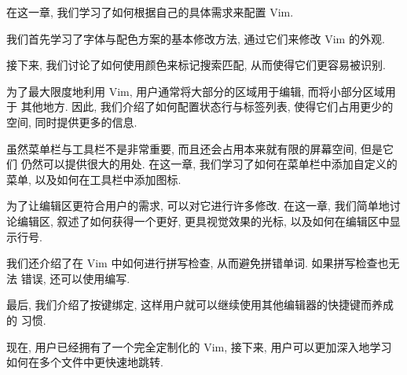 在这一章, 我们学习了如何根据自己的具体需求来配置 Vim.

我们首先学习了字体与配色方案的基本修改方法, 通过它们来修改 Vim 的外观.

接下来, 我们讨论了如何使用颜色来标记搜索匹配, 从而使得它们更容易被识别.

为了最大限度地利用 Vim, 用户通常将大部分的区域用于编辑, 而将小部分区域用于
其他地方. 因此, 我们介绍了如何配置状态行与标签列表, 使得它们占用更少的空间,
同时提供更多的信息.

虽然菜单栏与工具栏不是非常重要, 而且还会占用本来就有限的屏幕空间, 但是它们
仍然可以提供很大的用处. 在这一章, 我们学习了如何在菜单栏中添加自定义的菜单,
以及如何在工具栏中添加图标.

为了让编辑区更符合用户的需求, 可以对它进行许多修改. 在这一章, 我们简单地讨
论编辑区, 叙述了如何获得一个更好, 更具视觉效果的光标, 以及如何在编辑区中显
示行号.

我们还介绍了在 Vim 中如何进行拼写检查, 从而避免拼错单词. 如果拼写检查也无法
错误, 还可以使用编写.

最后, 我们介绍了按键绑定, 这样用户就可以继续使用其他编辑器的快捷键而养成的
习惯.

现在, 用户已经拥有了一个完全定制化的 Vim, 接下来, 用户可以更加深入地学习
如何在多个文件中更快速地跳转.
